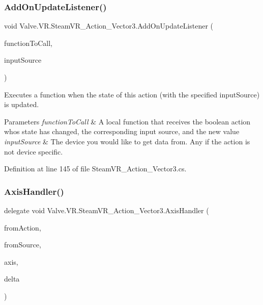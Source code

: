 \subsubsection{\texorpdfstring{AddOnUpdateListener()}{AddOnUpdateListener()}}
{\footnotesize\ttfamily void Valve.\+V\+R.\+Steam\+V\+R\+\_\+\+Action\+\_\+\+Vector3.\+Add\+On\+Update\+Listener (\begin{DoxyParamCaption}\item[{\mbox{\hyperlink{class_valve_1_1_v_r_1_1_steam_v_r___action___vector3_a99c0524f104c6d8c94a0e874b0ecc813}{Update\+Handler}}}]{function\+To\+Call,  }\item[{\mbox{\hyperlink{namespace_valve_1_1_v_r_a82e5bf501cc3aa155444ee3f0662853f}{Steam\+V\+R\+\_\+\+Input\+\_\+\+Sources}}}]{input\+Source }\end{DoxyParamCaption})}



Executes a function when the state of this action (with the specified input\+Source) is updated. 


\begin{DoxyParams}{Parameters}
{\em function\+To\+Call} & A local function that receives the boolean action who\textquotesingle{}s state has changed, the corresponding input source, and the new value\\
\hline
{\em input\+Source} & The device you would like to get data from. Any if the action is not device specific.\\
\hline
\end{DoxyParams}


Definition at line 145 of file Steam\+V\+R\+\_\+\+Action\+\_\+\+Vector3.\+cs.

\mbox{\label{class_valve_1_1_v_r_1_1_steam_v_r___action___vector3_a9b135b663b22c421dc36dbc48d2d35b6}} 
\subsubsection{\texorpdfstring{AxisHandler()}{AxisHandler()}}
{\footnotesize\ttfamily delegate void Valve.\+V\+R.\+Steam\+V\+R\+\_\+\+Action\+\_\+\+Vector3.\+Axis\+Handler (\begin{DoxyParamCaption}\item[{\mbox{\hyperlink{class_valve_1_1_v_r_1_1_steam_v_r___action___vector3}{Steam\+V\+R\+\_\+\+Action\+\_\+\+Vector3}}}]{from\+Action,  }\item[{\mbox{\hyperlink{namespace_valve_1_1_v_r_a82e5bf501cc3aa155444ee3f0662853f}{Steam\+V\+R\+\_\+\+Input\+\_\+\+Sources}}}]{from\+Source,  }\item[{Vector3}]{axis,  }\item[{Vector3}]{delta }\end{DoxyParamCaption})}

